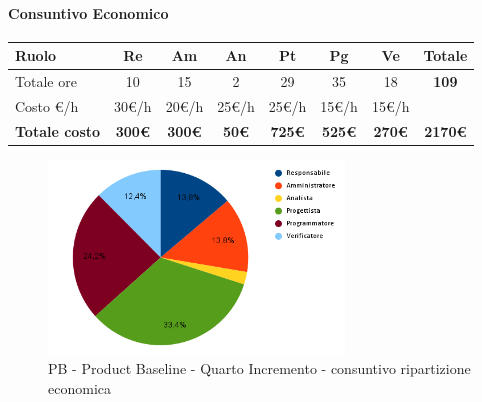 \paragraph{Consuntivo Economico}
\begin{center}
	\renewcommand{\arraystretch}{1.8}
	\begin{tabular}{ |m{6em}|c|c|c|c|c|c|c| }
	\hline
	\textbf{Ruolo} & \textbf{Re} & \textbf{Am} &  \textbf{An} &  \textbf{Pt} &  \textbf{Pg} &  \textbf{Ve} &  \textbf{Totale}\\
    \hline
    Totale ore & 10 & 15 & 2 & 29 & 35 & 18 & \textbf{109}\\
    \hline
    Costo \euro/h & 30\euro/h & 20\euro/h & 25\euro/h & 25\euro/h & 15\euro/h & 15\euro/h & \\
    \hline
    \textbf{Totale costo} & \textbf{300\euro} & \textbf{300\euro} &  \textbf{50\euro} & \textbf{725\euro} &  \textbf{525\euro} &  \textbf{270\euro} &  \textbf{2170\euro} \\
    \hline
	\end{tabular}

    \begin{figure}[H]
        \centering\includegraphics[width=0.7\textwidth, height=0.7\textheight, keepaspectratio]{images/consuntivo/consuntivo-PB-costo-quarto-incremento.png}
        \caption{PB - Product Baseline - Quarto Incremento - consuntivo ripartizione economica}
    \end{figure}
\end{center}

